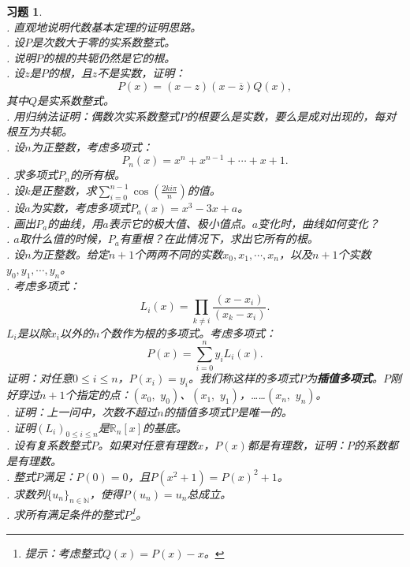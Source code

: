 \documentclass[12pt,UTF8]{ctexbook}
\theoremstyle{definition}
\theoremstyle{plain}
\newtheorem{xt}{习题}[section]
\begin{document}
\begin{appendix}
\begin{xt}
    \mbox{} \\
    . 直观地说明代数基本定理的证明思路。\\
    . 设$P$是次数大于零的实系数整式。\\
    . 说明$P$的根的共轭仍然是它的根。\\
    . 设$z$是$P$的根，且$z$不是实数，证明：
    $$ P(x) = (x - z)(x - \overline{z}) Q(x),$$
    其中$Q$是实系数整式。\\
    . 用归纳法证明：偶数次实系数整式$P$的根要么是实数，要么是成对出现的，每对根互为共轭。\\
    . 设$n$为正整数，考虑多项式：
    $$ P_n(x) = x^n + x^{n-1} + \cdots+ x + 1 . $$
    . 求多项式$P_n$的所有根。\\
    . 设$k$是正整数，求$\sum_{i=0}^{n-1}\cos{\left(\frac{2ki\pi}{n}\right)}$的值。\\
    . 设$a$为实数，考虑多项式$P_a(x) = x^3 - 3x + a$。\\
    . 画出$P_a$的曲线，用$a$表示它的极大值、极小值点。$a$变化时，曲线如何变化？\\
    . $a$取什么值的时候，$P_a$有重根？在此情况下，求出它所有的根。\\
    . 设$n$为正整数。给定$n+1$个两两不同的实数$x_0, x_1, \cdots, x_n$，以及$n+1$个实数$y_0, y_1, \cdots, y_n$。\\
    . 考虑多项式：
    $$ L_i(x) = \prod_{k\neq i}\frac{(x - x_i)}{(x_k - x_i)}.$$
    $L_i$是以除$x_i$以外的$n$个数作为根的多项式。考虑多项式：
    $$ P(x) = \sum_{i=0}^n y_i L_i(x).$$
    证明：对任意$0\leqslant i\leqslant n$，$P(x_i) = y_i$。我们称这样的多项式$P$为\textbf{插值多项式}。$P$刚好穿过$n+1$个指定的点：$(x_0,\,\,y_0)$、$(x_1,\,\,y_1)$，……$(x_n,\,\,y_n)$。\\
    . 证明：上一问中，次数不超过$n$的插值多项式$P$是唯一的。\\
    . 证明$\left(L_i\right)_{0\leqslant i \leqslant n}$是$\mathbb{R}_n[x]$的基底。\\
    . 设有复系数整式$P$。如果对任意有理数$x$，$P(x)$都是有理数，证明：$P$的系数都是有理数。\\
    . 整式$P$满足：$P(0)=0$，且$P(x^2 + 1) = P(x)^2 + 1$。\\
    . 求数列$\{u_n\}_{n\in\mathbb{N}}$，使得$P(u_n) = u_n$总成立。\\
    . 求所有满足条件的整式$P$\footnote{提示：考虑整式$Q(x) = P(x) - x$。}。\\

\end{xt}
\end{appendix}
\end{document}
